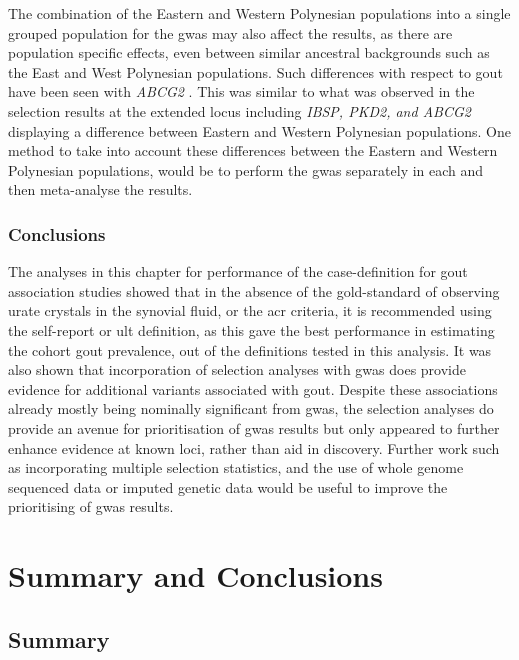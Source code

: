 \documentclass[twoside,openright]{report}
\begin{document}
The combination of the Eastern and Western Polynesian populations into a
single grouped population for the \gls{gwas} may also affect the
results, as there are population specific effects, even between similar
ancestral backgrounds such as the East and West Polynesian populations.
Such differences with respect to gout have been seen with \emph{ABCG2}
\citep{Phipps-Green2010}. This was similar to what was observed in the
selection results at the extended locus including \emph{IBSP, PKD2, and
ABCG2} displaying a difference between Eastern and Western Polynesian
populations. One method to take into account these differences between
the Eastern and Western Polynesian populations, would be to perform the
\gls{gwas} separately in each and then meta-analyse the results.

\subsection{Conclusions}\label{conclusions-1}

The analyses in this chapter for performance of the case-definition for
gout association studies showed that in the absence of the gold-standard
of observing urate crystals in the synovial fluid, or the \gls{acr}
criteria, it is recommended using the self-report or \gls{ult}
definition, as this gave the best performance in estimating the cohort
gout prevalence, out of the definitions tested in this analysis. It was
also shown that incorporation of selection analyses with \gls{gwas} does
provide evidence for additional variants associated with gout. Despite
these associations already mostly being nominally significant from
\gls{gwas}, the selection analyses do provide an avenue for
prioritisation of \gls{gwas} results but only appeared to further
enhance evidence at known loci, rather than aid in discovery. Further
work such as incorporating multiple selection statistics, and the use of
whole genome sequenced data or imputed genetic data would be useful to
improve the prioritising of \gls{gwas} results.

\chapter{Summary and Conclusions}\label{summary-and-conclusions}

\section{Summary}\label{summary}
\end{document}
